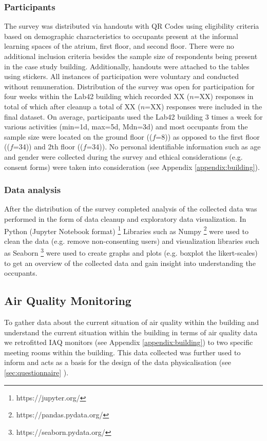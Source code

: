 \subsubsection{Participants}
The survey was distributed via handouts with QR Codes using eligibility criteria based on demographic characteristics to occupants present at the informal learning spaces of the atrium, first floor, and second floor. There were no additional inclusion criteria besides the sample size of respondents being present in the case study building. Additionally, handouts were attached to the tables using stickers. All instances of participation were voluntary and conducted without remuneration. Distribution of the survey was open for participation for four weeks within the Lab42 building which recorded XX ($n$=XX) responses in total of which after cleanup a total of XX ($n$=XX) responses were included in the final dataset. On average, participants used the Lab42 building 3 times a week for various activities (min=1d, max=5d, Mdn=3d) and most occupants from the sample size were located on the ground floor (($f$=8)) as opposed to the first floor (($f$=34)) and 2th floor (($f$=34)). No personal identifiable information such as age and gender were collected during the survey and ethical considerations (e.g. consent forms) were taken into consideration (see Appendix \ref{appendix:building}).

\subsubsection{Data analysis}
\label{sec:analysis}
After the distribution of the survey completed analysis of the collected data was performed in the form of data cleanup and exploratory data visualization. In Python (Jupyter Notebook format) \footnote{https://jupyter.org/} Libraries such as Numpy \footnote{https://pandas.pydata.org/} were used to clean the data (e.g. remove non-consenting users) and visualization libraries such as Seaborn \footnote{https://seaborn.pydata.org/} were used to create graphs and plots (e.g. boxplot the likert-scales) to get an overview of the collected data and gain insight into understanding the occupants.

\subsection{Air Quality Monitoring}

To gather data about the current situation of air quality within the building and understand the current situation within the building in terms of air quality data we retrofitted IAQ monitors (see Appendix \ref{appendix:building}) to two specific meeting rooms within the building.  This data collected was further used to inform and acts as a basis for the design of the data physicalisation (see \ref{sec:questionnaire} ).

